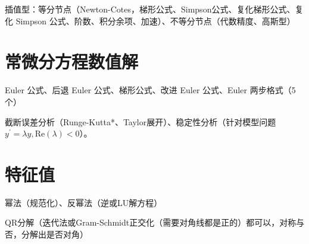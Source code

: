 \documentclass[twocolumn]{ctexart}
\begin{document}
插值型：等分节点（Newton-Cotes，梯形公式、Simpson公式、复化梯形公式、复化 Simpson 公式、阶数、积分余项、加速）、不等分节点（代数精度、高斯型）

\section{常微分方程数值解}

Euler 公式、后退 Euler 公式、梯形公式、改进 Euler 公式、Euler 两步格式（5个）

截断误差分析（Runge-Kutta*、Taylor展开）、稳定性分析（针对模型问题 $y^\prime=\lambda y,\text{Re}(\lambda)<0$）。

\section{特征值}

幂法（规范化）、反幂法（逆或LU解方程）

QR分解（迭代法或Gram-Schmidt正交化（需要对角线都是正的）都可以，对称与否，分解出是否对角）
\end{document}

